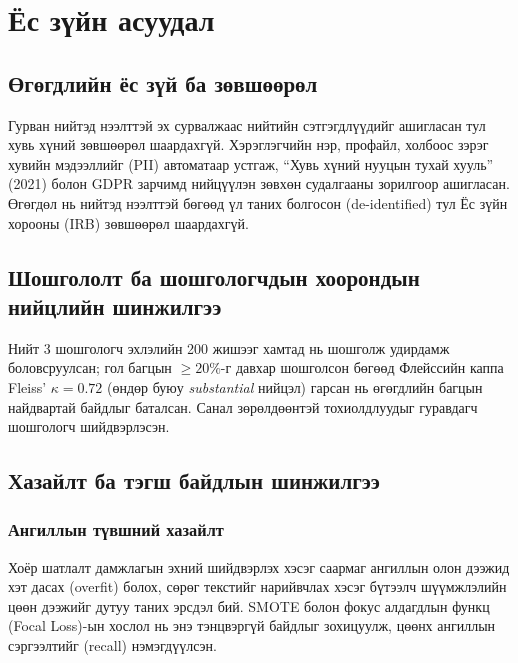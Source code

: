 ﻿%

\chapter{Ёс зүйн асуудал}
\label{Chapter7}

\section{Өгөгдлийн ёс зүй ба зөвшөөрөл}

Гурван нийтэд нээлттэй эх сурвалжаас нийтийн сэтгэгдлүүдийг ашигласан тул хувь хүний зөвшөөрөл шаардахгүй. Хэрэглэгчийн нэр, профайл, холбоос зэрэг хувийн мэдээллийг (PII) автоматаар устгаж, ``Хувь хүний нууцын тухай хууль'' (2021) болон GDPR зарчимд нийцүүлэн зөвхөн судалгааны зорилгоор ашигласан. Өгөгдөл нь нийтэд нээлттэй бөгөөд үл таних болгосон (de-identified) тул Ёс зүйн хорооны (IRB) зөвшөөрөл шаардахгүй.

\section{Шошгололт ба шошгологчдын хоорондын нийцлийн шинжилгээ}

Нийт 3 шошгологч эхлэлийн 200 жишээг хамтад нь шошголж удирдамж боловсруулсан; гол багцын $\geq\!20\%$-г давхар шошголсон бөгөөд Флейссийн каппа Fleiss' $\kappa{=}0.72$ (өндөр буюу \textit{substantial} нийцэл) гарсан нь өгөгдлийн багцын найдвартай байдлыг баталсан. Санал зөрөлдөөнтэй тохиолдлуудыг гуравдагч шошгологч шийдвэрлэсэн.

\section{Хазайлт ба тэгш байдлын шинжилгээ}


\subsection{Ангиллын түвшний хазайлт}
\label{sec:class-bias}

Хоёр шатлалт дамжлагын эхний шийдвэрлэх хэсэг саармаг ангиллын олон дээжид хэт дасах (overfit) болох, сөрөг текстийг нарийвчлах хэсэг бүтээлч шүүмжлэлийн цөөн дээжийг дутуу таних эрсдэл бий. SMOTE болон фокус алдагдлын функц (Focal Loss)-ын хослол нь энэ тэнцвэргүй байдлыг зохицуулж, цөөнх ангиллын сэргээлтийг (recall) нэмэгдүүлсэн.

